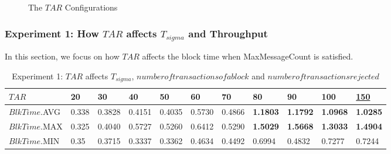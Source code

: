 \documentclass[10pt,journal,compsoc, twoside]{IEEEtran}
\begin{document}
\begin{figure}[htbp]
{
		
	}
	\caption{The $TAR$ Configurations}
\end{figure}




\subsubsection{Experiment 1: How $TAR$ affects $T_{sigma}$ and Throughput}

In this section, we focus on how $TAR$ affects the block time when MaxMessageCount is satisfied.

\begin{table*}[htbp]
	\caption{Experiment 1: $TAR$ affects $T_{sigma}$, $number of transactions of a block$ and $number of transactions rejected$}
	\begin{tabular}{|l|l|l|l|l|l|l|l|l|l|l|}
		\hline
		$TAR$           & 20    & 30     & 40     & 50     & 60     & 70     & 80              & 90              & 100             & \underline{150 }      \\ \hline
		$BlkTime$.AVG & 0.338 & 0.3828 & 0.4151 & 0.4035 & 0.5730 & 0.4866 & \textbf{1.1803} & \textbf{1.1792} & \textbf{1.0968} & \textbf{1.0285} \\ \hline
		$BlkTime$.MAX & 0.325 & 0.4040 & 0.5727 & 0.5260 & 0.6412 & 0.5290 & \textbf{1.5029} & \textbf{1.5668} & \textbf{1.3033} & \textbf{1.4904} \\ \hline
		$BlkTime$.MIN & 0.35  & 0.3715 & 0.3337 & 0.3362 & 0.4634 & 0.4492 & 0.6994          & 0.4832          & 0.7277          & 0.7244          \\ \hline
	\end{tabular}
\end{table*}
\end{document}
